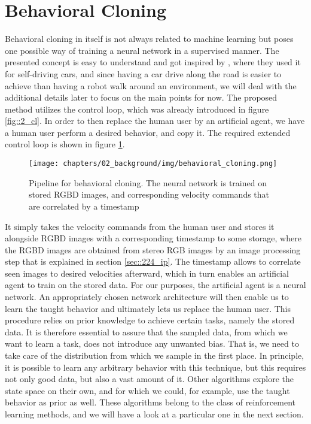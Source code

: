 \FloatBarrier
\section{Behavioral Cloning}
\label{sec::222_bc}
Behavioral cloning in itself is not always related to machine learning but poses one possible way of training a neural network in a supervised manner. The presented concept is easy to understand and got inspired by \cite{bojarski2016end}, where they used it for self-driving cars, and since having a car drive along the road is easier to achieve than having a robot walk around an environment, we will deal with the additional details later to focus on the main points for now. The proposed method utilizes the control loop, which was already introduced in figure \ref{fig::2_cl}. In order to then replace the human user by an artificial agent, we have a human user perform a desired behavior, and copy it. The required extended control loop is shown in figure \ref{fig::222_bc}.
\begin{figure}[h!]
	\centering
	\texttt{[image: chapters/02\_background/img/behavioral\_cloning.png]}
	\caption{Pipeline for behavioral cloning. The neural network is trained on stored RGBD images, and corresponding velocity commands that are correlated by a timestamp}
	\label{fig::222_bc}
\end{figure}
It simply takes the velocity commands from the human user and stores it alongside RGBD images with a corresponding timestamp to some storage, where the RGBD images are obtained from stereo RGB images by an image processing step that is explained in section \ref{sec::224_ip}. The timestamp allows to correlate seen images to desired velocities afterward, which in turn enables an artificial agent to train on the stored data. For our purposes, the artificial agent is a neural network. An appropriately chosen network architecture will then enable us to learn the taught behavior and ultimately lets us replace the human user. This procedure relies on prior knowledge to achieve certain tasks, namely the stored data. It is therefore essential to assure that the sampled data, from which we want to learn a task, does not introduce any unwanted bias. That is, we need to take care of the distribution from which we sample in the first place. In principle, it is possible to learn any arbitrary behavior with this technique, but this requires not only good data, but also a vast amount of it. Other algorithms explore the state space on their own, and for which we could, for example, use the taught behavior as prior as well. These algorithms belong to the class of reinforcement learning methods, and we will have a look at a particular one in the next section.